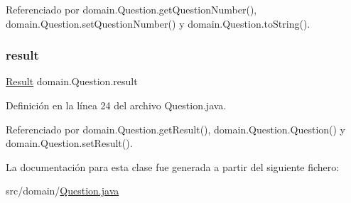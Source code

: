 Referenciado por domain.\+Question.\+get\+Question\+Number(), domain.\+Question.\+set\+Question\+Number() y domain.\+Question.\+to\+String().

\mbox{\label{classdomain_1_1Question_a74d098c940c1c91c8f37fd9288ebd3d3}} 
\subsubsection{\texorpdfstring{result}{result}}
{\footnotesize\ttfamily \mbox{\hyperlink{classdomain_1_1Result}{Result}} domain.\+Question.\+result\hspace{0.3cm}{\ttfamily [private]}}



Definición en la línea 24 del archivo Question.\+java.



Referenciado por domain.\+Question.\+get\+Result(), domain.\+Question.\+Question() y domain.\+Question.\+set\+Result().



La documentación para esta clase fue generada a partir del siguiente fichero\+:\begin{DoxyCompactItemize}
\item 
src/domain/\mbox{\hyperlink{Question_8java}{Question.\+java}}\end{DoxyCompactItemize}
